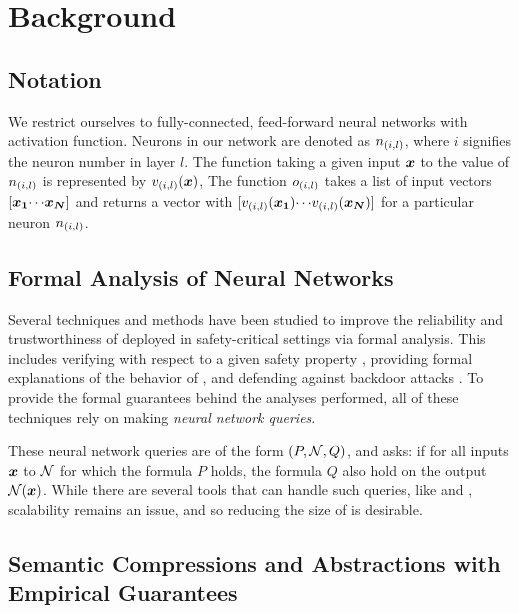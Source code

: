\section{Background}
\subsection{Notation}

We restrict ourselves to fully-connected, feed-forward neural networks with
\relu activation function. 
Neurons in our network are denoted as $n_{(i,l)}$, where $i$ signifies the 
neuron number in layer $l$.  %
The function taking a given input $\boldsymbol{x}$ to the value of $n_{(i,l)}$ is
represented by $v_{(i,l)}(\boldsymbol{x})$, %
The function $o_{(i,l)}$ takes a list of input vectors
$[\boldsymbol{x_1} {\cdots} \boldsymbol{x_N}]$ and returns a vector with
$[v_{(i,l)}(\boldsymbol{x_1}) {\cdots} v_{(i,l)}(\boldsymbol{x_N})]$ for a particular
neuron $n_{(i,l)}$.  %

\subsection{Formal Analysis of Neural Networks }
\label{s:form-an}

Several techniques and methods have been studied to improve the reliability and
trustworthiness of \dnn deployed in safety-critical settings via formal
analysis. This includes verifying \dnn with respect to a given
safety property \cite{reluplex, cegar-nn, deeppoly, cegarette, cleverest-nn,
conv-abs-gk, deep-abstract, lin-comb-abs-jan}, providing formal explanations of
the behavior of \dnn \cite{minimal-image-fxai, overview-fxai}, and defending
against backdoor attacks \cite{backdoor-verification}.
 To provide the formal guarantees behind the
analyses performed, all of these techniques rely on making \textit{neural
network queries}. 

These neural network queries are of the form $(P, \mathcal{N}, Q)$, and asks: if
for all inputs $\boldsymbol{x}$ to $\mathcal{N}$ for which the formula $P$ holds, 
the formula $Q$ also hold on the output $\mathcal{N}(\boldsymbol{x})$. While there are
several
tools that can handle such queries, like \marabou and \abcrown, scalability
remains an issue, and so reducing the size of \cnc is desirable.

\subsection{Semantic Compressions and Abstractions with Empirical Guarantees}
\label{s:emp-abs}

